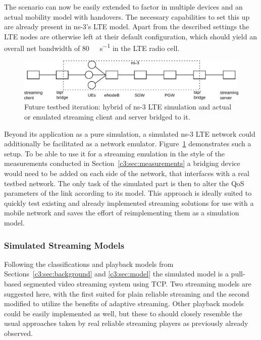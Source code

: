 The scenario can now be easily extended to factor in multiple devices and an actual mobility model with handovers. The necessary capabilities to set this up are already present in ns-3's \gls{LTE} model. Apart from the described settings the \gls{LTE} nodes are otherwise left at their default configuration, which should yield an overall net bandwidth of \SI{80}{\mega\bit\per\second} in the \gls{LTE} radio cell.

\begin{figure}[htb]
	\centering
	\includegraphics[width=1.0\textwidth]{images/streaming-hybrid.pdf}
	\caption{Future testbed iteration: hybrid of ns-3 \acrshort{LTE} simulation and actual or emulated streaming client and server bridged to it.}
\label{c6:fig:streaming-hybrid}
\end{figure}

Beyond its application as a pure simulation, a simulated ns-3 \gls{LTE} network could additionally be facilitated as a network emulator. Figure~\ref{c6:fig:streaming-hybrid} demonstrates such a setup. To be able to use it for a streaming emulation in the style of the measurements conducted in Section~\ref{c3:sec:measurements} a bridging device would need to be added on each side of the network, that interfaces with a real testbed network. The only task of the simulated part is then to alter the \gls{QoS} parameters of the link according to its model. This approach is ideally suited to quickly test existing and already implemented streaming solutions for use with a mobile network and saves the effort of reimplementing them as a simulation model.


\subsubsection{Simulated Streaming Models}

Following the classifications and playback models from Sections~\ref{c3:sec:background} and \ref{c3:sec:model} the simulated model is a pull-based segmented video streaming system using \gls{TCP}. Two streaming models are suggested here, with the first suited for plain reliable streaming and the second modified to utilize the benefits of adaptive streaming. Other playback models could be easily implemented as well, but these to should closely resemble the usual approaches taken by real reliable streaming players as previously already observed.


